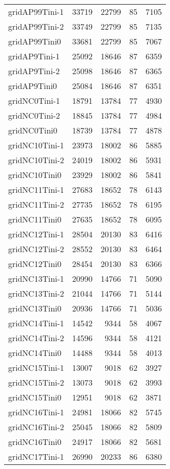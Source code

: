 \begin{tabular}{lrrrr}
gridAP99Tini-1 & 33719 & 22799 & 85 & 7105 \\
gridAP99Tini-2 & 33749 & 22799 & 85 & 7135 \\
gridAP99Tini0 & 33681 & 22799 & 85 & 7067 \\
gridAP9Tini-1 & 25092 & 18646 & 87 & 6359 \\
gridAP9Tini-2 & 25098 & 18646 & 87 & 6365 \\
gridAP9Tini0 & 25084 & 18646 & 87 & 6351 \\
gridNC0Tini-1 & 18791 & 13784 & 77 & 4930 \\
gridNC0Tini-2 & 18845 & 13784 & 77 & 4984 \\
gridNC0Tini0 & 18739 & 13784 & 77 & 4878 \\
gridNC10Tini-1 & 23973 & 18002 & 86 & 5885 \\
gridNC10Tini-2 & 24019 & 18002 & 86 & 5931 \\
gridNC10Tini0 & 23929 & 18002 & 86 & 5841 \\
gridNC11Tini-1 & 27683 & 18652 & 78 & 6143 \\
gridNC11Tini-2 & 27735 & 18652 & 78 & 6195 \\
gridNC11Tini0 & 27635 & 18652 & 78 & 6095 \\
gridNC12Tini-1 & 28504 & 20130 & 83 & 6416 \\
gridNC12Tini-2 & 28552 & 20130 & 83 & 6464 \\
gridNC12Tini0 & 28454 & 20130 & 83 & 6366 \\
gridNC13Tini-1 & 20990 & 14766 & 71 & 5090 \\
gridNC13Tini-2 & 21044 & 14766 & 71 & 5144 \\
gridNC13Tini0 & 20936 & 14766 & 71 & 5036 \\
gridNC14Tini-1 & 14542 & 9344 & 58 & 4067 \\
gridNC14Tini-2 & 14596 & 9344 & 58 & 4121 \\
gridNC14Tini0 & 14488 & 9344 & 58 & 4013 \\
gridNC15Tini-1 & 13007 & 9018 & 62 & 3927 \\
gridNC15Tini-2 & 13073 & 9018 & 62 & 3993 \\
gridNC15Tini0 & 12951 & 9018 & 62 & 3871 \\
gridNC16Tini-1 & 24981 & 18066 & 82 & 5745 \\
gridNC16Tini-2 & 25045 & 18066 & 82 & 5809 \\
gridNC16Tini0 & 24917 & 18066 & 82 & 5681 \\
gridNC17Tini-1 & 26990 & 20233 & 86 & 6380 \\

\end{tabular}
